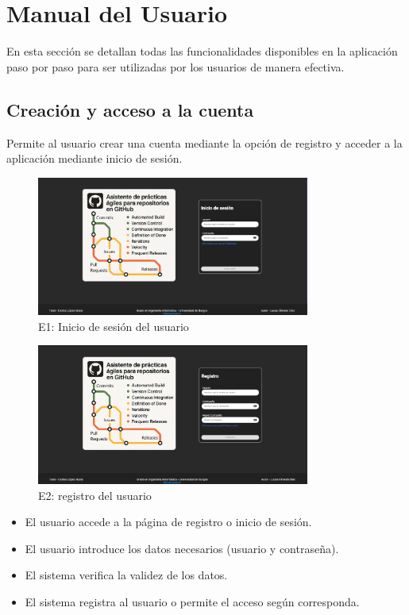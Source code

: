 \section{Manual del Usuario}
En esta sección se detallan todas las funcionalidades disponibles en la aplicación paso por paso para ser utilizadas por los usuarios de manera efectiva.

\newpage
\subsection{Creación y acceso a la cuenta}

Permite al usuario crear una cuenta mediante la opción de registro y acceder a la aplicación mediante inicio de sesión.

\begin{figure}[H]
\centering
\includegraphics[width=0.8\textwidth]{img/E1-login.png}
\caption{E1: Inicio de sesión del usuario}
\label{fig:E1-login}
\end{figure}

\begin{figure}[H]
\centering
\includegraphics[width=0.8\textwidth]{img/E2-register.png}
\caption{E2: registro del usuario}
\label{fig:E2-register}
\end{figure}

\begin{itemize}
    \item El usuario accede a la página de registro o inicio de sesión.
    \item El usuario introduce los datos necesarios (usuario y contraseña).
    \item El sistema verifica la validez de los datos.
    \item El sistema registra al usuario o permite el acceso según corresponda.
\end{itemize}

